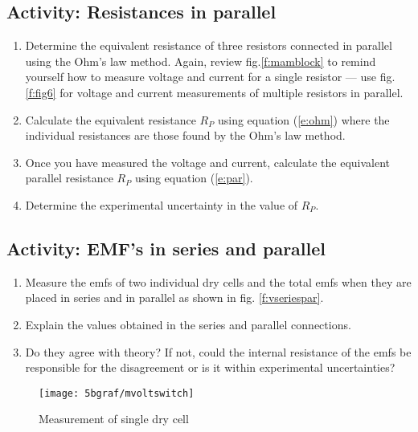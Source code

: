 \subsection{Activity: Resistances in parallel}
\begin{enumerate}
	\item Determine the equivalent resistance of three resistors connected in parallel using the Ohm's law method.  Again, review fig.\ref{f:mamblock} to remind yourself how to measure voltage and current for a single resistor --- use fig. \ref{f:fig6} for voltage and current measurements of multiple resistors in parallel.
	
	\item Calculate the equivalent resistance $R_P$ using equation (\ref{e:ohm}) where the individual resistances are those found by the Ohm's law method.

	\item Once you have measured the voltage and current, calculate the equivalent parallel resistance $R_P$ using equation (\ref{e:par}).
	
	\item Determine the experimental uncertainty in the value of $R_P$.
\end{enumerate}


\subsection{Activity: EMF's in series and parallel}
\begin{enumerate}
	\item Measure the emfs of two individual dry cells and the total emfs when they are placed in series and in parallel as shown in fig. \ref{f:vseriespar}.
	
	\item Explain the values obtained in the series and parallel connections.
	
	\item Do they agree with theory?  If not, could the internal resistance of the emfs be responsible for the disagreement or is it within experimental uncertainties?
\end{enumerate}

\begin{figure}[htbp]
\centering
	\texttt{[image: 5bgraf/mvoltswitch]}
\caption{Measurement of single dry cell}
\label{f:mvoltswitch}
\end{figure}



